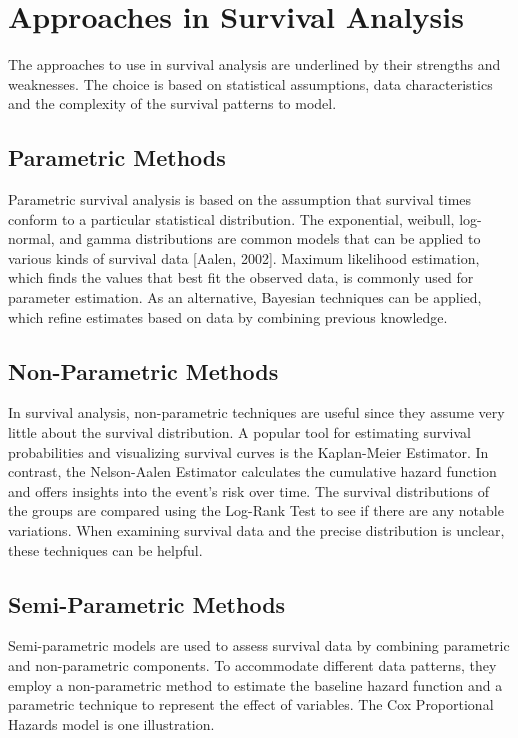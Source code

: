 \documentclass[doublespacing,12pt]{report}
\begin{document}
\section{Approaches in Survival Analysis}

The approaches to use in survival analysis are underlined by their strengths and weaknesses. The choice is based on statistical assumptions, data characteristics and the complexity of the survival patterns to model.

\subsection{Parametric Methods}

Parametric survival analysis is based on the assumption that survival times conform to a particular statistical distribution. The exponential, weibull, log-normal, and gamma distributions are common models that can be applied to various kinds of survival data [Aalen, 2002]. Maximum likelihood estimation, which finds the values that best fit the observed data, is commonly used for parameter estimation. As an alternative, Bayesian techniques can be applied, which refine estimates based on data by combining previous knowledge.

\subsection{Non-Parametric Methods}

In survival analysis, non-parametric techniques are useful since they assume very little about the survival distribution. A popular tool for estimating survival probabilities and visualizing survival curves is the Kaplan-Meier Estimator. In contrast, the Nelson-Aalen Estimator calculates the cumulative hazard function and offers insights into the event's risk over time. The survival distributions of the groups are compared using the Log-Rank Test to see if there are any notable variations. When examining survival data and the precise distribution is unclear, these techniques can be helpful.




\subsection{Semi-Parametric Methods}

Semi-parametric models are used to assess survival data by combining parametric and non-parametric components. To accommodate different data patterns, they employ a non-parametric method to estimate the baseline hazard function and a parametric technique to represent the effect of variables. The Cox Proportional Hazards model is one illustration.
\end{document}
